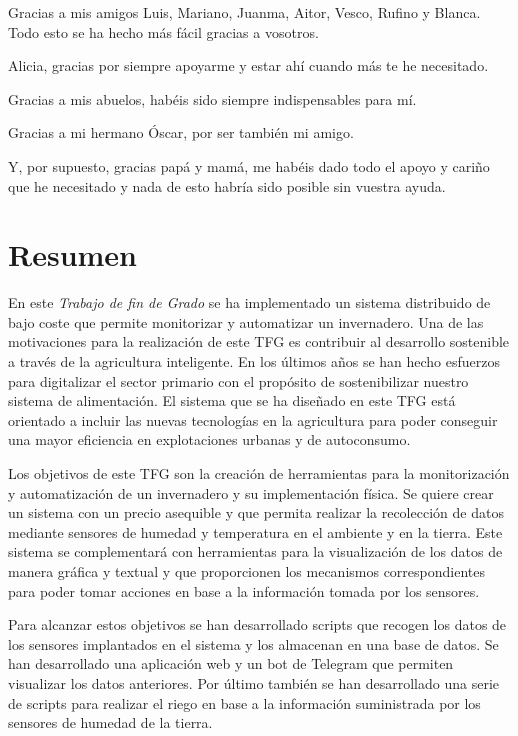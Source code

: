 \documentclass[a4paper, 12pt, oneside]{book}
\begin{document}
Gracias a mis amigos Luis, Mariano, Juanma, Aitor, Vesco, Rufino y Blanca. Todo esto se ha hecho más fácil gracias a vosotros.

Alicia, gracias por siempre apoyarme y estar ahí cuando más te he necesitado.

Gracias a mis abuelos, habéis sido siempre indispensables para mí.

Gracias a mi hermano Óscar, por ser también mi amigo.

Y, por supuesto, gracias papá y mamá, me habéis dado todo el apoyo y cariño que he necesitado y nada de esto habría sido posible sin vuestra ayuda.


\chapter*{Resumen}
En este \textit{Trabajo de fin de Grado} se ha implementado un sistema distribuido de bajo coste que permite monitorizar y automatizar un invernadero. Una de las motivaciones para la realización de este TFG es contribuir al desarrollo sostenible a través de la agricultura inteligente. En los últimos años se han hecho esfuerzos para digitalizar el sector primario con el propósito de sostenibilizar nuestro sistema de alimentación. El sistema que se ha diseñado en este TFG está orientado a incluir las nuevas tecnologías en la agricultura para poder conseguir una mayor eficiencia en explotaciones urbanas y de autoconsumo.

Los objetivos de este TFG son la creación de herramientas para la monitorización y automatización de un invernadero y su implementación física. Se quiere crear un sistema con un precio asequible y que permita realizar la recolección de datos mediante sensores de humedad y temperatura en el ambiente y en la tierra. Este sistema se complementará con herramientas para la visualización de los datos de manera gráfica y textual y que proporcionen los mecanismos correspondientes para poder tomar acciones en base a la información tomada por los sensores.

Para alcanzar estos objetivos se han desarrollado scripts que recogen los datos de los sensores implantados en el sistema y los almacenan en una base de datos. Se han desarrollado una aplicación web y un bot de Telegram que permiten visualizar los datos anteriores. Por último también se han desarrollado una serie de scripts para realizar el riego en base a la información suministrada por los sensores de humedad de la tierra.
\end{document}
